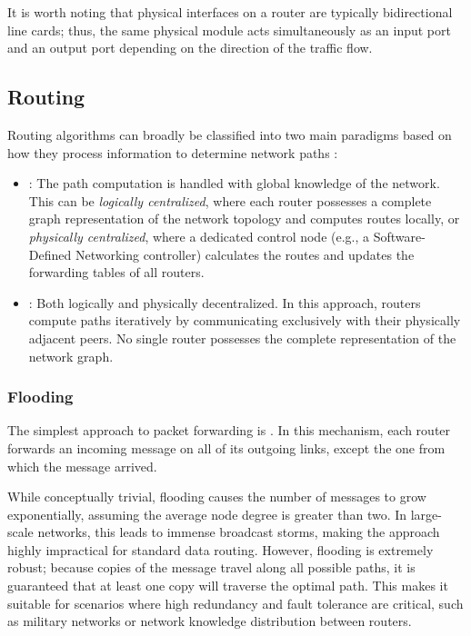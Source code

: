It is worth noting that physical interfaces on a router are typically bidirectional line cards; thus, the same physical module acts simultaneously as an input port and an output port depending on the direction of the traffic flow.

\subsection{Routing}
Routing algorithms can broadly be classified into two main paradigms based on how they process information to determine network paths \cite{kurose2017}:
\begin{itemize}
    \item {}: The path computation is handled with global knowledge of the network. This can be \emph{logically centralized}, where each router possesses a complete graph representation of the network topology and computes routes locally, or \emph{physically centralized}, where a dedicated control node (e.g., a Software-Defined Networking controller) calculates the routes and updates the forwarding tables of all routers.
    \item {}: Both logically and physically decentralized. In this approach, routers compute paths iteratively by communicating exclusively with their physically adjacent peers. No single router possesses the complete representation of the network graph.
\end{itemize}

\subsubsection{Flooding}
The simplest approach to packet forwarding is . In this mechanism, each router forwards an incoming message on all of its outgoing links, except the one from which the message arrived. 

While conceptually trivial, flooding causes the number of messages to grow exponentially, assuming the average node degree is greater than two. In large-scale networks, this leads to immense broadcast storms, making the approach highly impractical for standard data routing. However, flooding is extremely robust; because copies of the message travel along all possible paths, it is guaranteed that at least one copy will traverse the optimal path. This makes it suitable for scenarios where high redundancy and fault tolerance are critical, such as military networks or network knowledge distribution between routers.

